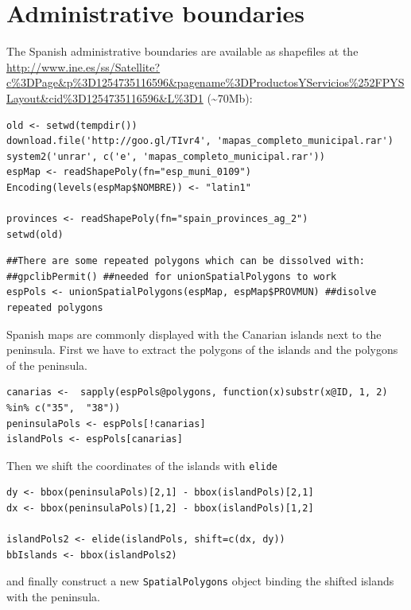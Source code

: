 \section{Administrative boundaries}
\label{sec-2}

The Spanish administrative boundaries are available as shapefiles at the \url{http://www.ine.es/ss/Satellite?c%3DPage&p%3D1254735116596&pagename%3DProductosYServicios%252FPYSLayout&cid%3D1254735116596&L%3D1} (\~{}70Mb):

\lstset{language=R}
\begin{lstlisting}
old <- setwd(tempdir())
download.file('http://goo.gl/TIvr4', 'mapas_completo_municipal.rar')
system2('unrar', c('e', 'mapas_completo_municipal.rar'))
espMap <- readShapePoly(fn="esp_muni_0109")
Encoding(levels(espMap$NOMBRE)) <- "latin1"

provinces <- readShapePoly(fn="spain_provinces_ag_2")
setwd(old)
\end{lstlisting}

  


\lstset{language=R}
\begin{lstlisting}
##There are some repeated polygons which can be dissolved with:
##gpclibPermit() ##needed for unionSpatialPolygons to work
espPols <- unionSpatialPolygons(espMap, espMap$PROVMUN) ##disolve repeated polygons
\end{lstlisting}

Spanish maps are commonly displayed with the Canarian islands next to
the peninsula. First we have to extract the polygons of the islands
and the polygons of the peninsula. 

\lstset{language=R}
\begin{lstlisting}
canarias <-  sapply(espPols@polygons, function(x)substr(x@ID, 1, 2) %in% c("35",  "38"))
peninsulaPols <- espPols[!canarias]
islandPols <- espPols[canarias]
\end{lstlisting}

Then we shift the coordinates of the islands with \texttt{elide}

\lstset{language=R}
\begin{lstlisting}
dy <- bbox(peninsulaPols)[2,1] - bbox(islandPols)[2,1]
dx <- bbox(peninsulaPols)[1,2] - bbox(islandPols)[1,2]

islandPols2 <- elide(islandPols, shift=c(dx, dy))
bbIslands <- bbox(islandPols2)
\end{lstlisting}

and finally construct a new \texttt{SpatialPolygons} object binding the
shifted islands with the peninsula.


